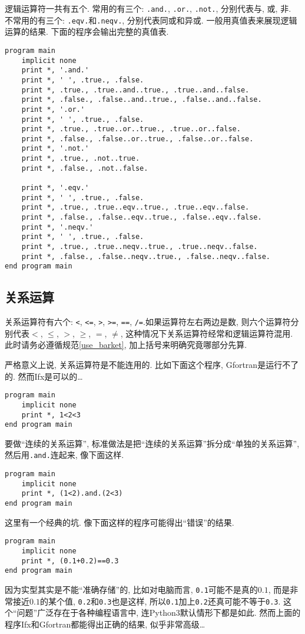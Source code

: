 逻辑运算符一共有五个. 常用的有三个: \texttt{.and.}, \texttt{.or.}, \texttt{.not.}, 分别代表与, 或, 非. 不常用的有三个: \texttt{.eqv.}和\texttt{.neqv.}, 分别代表同或和异或. 一般用真值表来展现逻辑运算的结果. 下面的程序会输出完整的真值表.
\begin{lstlisting}
program main
    implicit none
    print *, '.and.'
    print *, ' ', .true., .false.
    print *, .true., .true..and..true., .true..and..false.
    print *, .false., .false..and..true., .false..and..false.
    print *, '.or.'
    print *, ' ', .true., .false.
    print *, .true., .true..or..true., .true..or..false.
    print *, .false., .false..or..true., .false..or..false.
    print *, '.not.'
    print *, .true., .not..true.
    print *, .false., .not..false.
  
    print *, '.eqv.'
    print *, ' ', .true., .false.
    print *, .true., .true..eqv..true., .true..eqv..false.
    print *, .false., .false..eqv..true., .false..eqv..false.
    print *, '.neqv.'
    print *, ' ', .true., .false.
    print *, .true., .true..neqv..true., .true..neqv..false.
    print *, .false., .false..neqv..true., .false..neqv..false.
end program main
\end{lstlisting}

\subsection{关系运算}

关系运算符有六个: \texttt{<}, \texttt{<=}, \texttt{>}, \texttt{>=}, \texttt{==}, \texttt{/=}.如果运算符左右两边是数, 则六个运算符分别代表$<$, $\leqslant$, $>$, $\geqslant$, $=$, $\ne$, 这种情况下关系运算符经常和逻辑运算符混用. 此时请务必遵循规范\ref{use_barket}, 加上括号来明确究竟哪部分先算.

严格意义上说, 关系运算符是不能连用的. 比如下面这个程序, Gfortran是运行不了的. 然而Ifx是可以的\dots
\begin{lstlisting}
program main
    implicit none
    print *, 1<2<3
end program main
\end{lstlisting}

要做``连续的关系运算'', 标准做法是把``连续的关系运算''拆分成``单独的关系运算'', 然后用\texttt{.and.}连起来, 像下面这样.
\begin{lstlisting}
program main
    implicit none
    print *, (1<2).and.(2<3)
end program main
\end{lstlisting}

这里有一个经典的坑. 像下面这样的程序可能得出``错误''的结果.
\begin{lstlisting}
program main
    implicit none
    print *, (0.1+0.2)==0.3
end program main
\end{lstlisting}
因为实型其实是不能``准确存储''的, 比如对电脑而言, \texttt{0.1}可能不是真的$0.1$, 而是非常接近$0.1$的某个值, \texttt{0.2}和\texttt{0.3}也是这样, 所以\texttt{0.1}加上\texttt{0.2}还真可能不等于\texttt{0.3}. 这个``问题''广泛存在于各种编程语言中, 连Python3默认情形下都是如此. 然而上面的程序Ifx和Gfortran都能得出正确的结果, 似乎非常高级\dots

